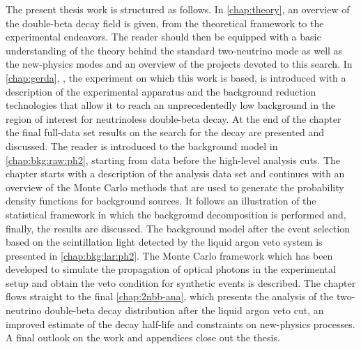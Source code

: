 The present thesis work is structured as follows. In \cref{chap:theory}, an overview of
the double-beta decay field is given, from the theoretical framework to the experimental
endeavors. The reader should then be equipped with a basic understanding of the theory
behind the standard two-neutrino mode as well as the new-physics modes and an overview of
the projects devoted to this search. In \cref{chap:gerda}, \gerda, the experiment on which
this work is based, is introduced with a description of the experimental apparatus and the
background reduction technologies that allow it to reach an unprecedentedly low background
in the region of interest for neutrinoless double-beta decay. At the end of the chapter
the final full-data set results on the search for the decay are presented and discussed.
The reader is introduced to the background model in \cref{chap:bkg:raw:ph2}, starting from
data before the high-level analysis cuts. The chapter starts with a description of the
analysis data set and continues with an overview of the Monte Carlo methods that are used
to generate the probability density functions for background sources. It follows an
illustration of the statistical framework in which the background decomposition is
performed and, finally, the results are discussed. The background model after the event
selection based on the scintillation light detected by the liquid argon veto system is
presented in \cref{chap:bkg:lar:ph2}. The Monte Carlo framework which has been developed
to simulate the propagation of optical photons in the experimental setup and obtain the
veto condition for synthetic events is described. The chapter flows straight to the final
\cref{chap:2nbb-ana}, which presents the analysis of the two-neutrino double-beta decay
distribution after the liquid argon veto cut, an improved estimate of the decay half-life
and constraints on new-physics processes. A final outlook on the work and appendices close
out the thesis.

\chapendgliph{}

